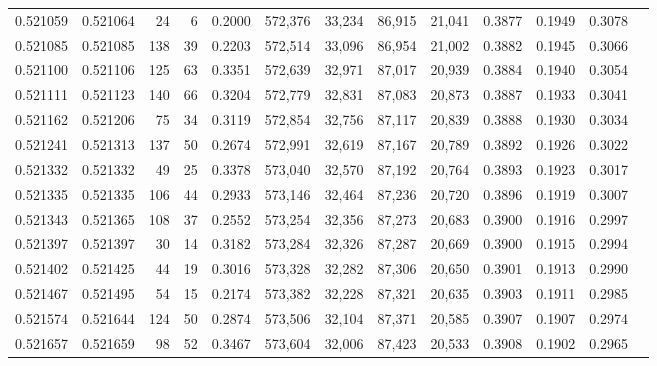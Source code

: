 \begin{tabular}{rrrrrrrrrrrrr}
0.521059 & 0.521064 &    24 &     6 &                                     0.2000 & 572,376 &  33,234 &  86,915 &  21,041 & 0.3877 & 0.1949 & 0.3078 \\
0.521085 & 0.521085 &   138 &    39 &                                     0.2203 & 572,514 &  33,096 &  86,954 &  21,002 & 0.3882 & 0.1945 & 0.3066 \\
0.521100 & 0.521106 &   125 &    63 &                                     0.3351 & 572,639 &  32,971 &  87,017 &  20,939 & 0.3884 & 0.1940 & 0.3054 \\
0.521111 & 0.521123 &   140 &    66 &                                     0.3204 & 572,779 &  32,831 &  87,083 &  20,873 & 0.3887 & 0.1933 & 0.3041 \\
0.521162 & 0.521206 &    75 &    34 &                                     0.3119 & 572,854 &  32,756 &  87,117 &  20,839 & 0.3888 & 0.1930 & 0.3034 \\
0.521241 & 0.521313 &   137 &    50 &                                     0.2674 & 572,991 &  32,619 &  87,167 &  20,789 & 0.3892 & 0.1926 & 0.3022 \\
0.521332 & 0.521332 &    49 &    25 &                                     0.3378 & 573,040 &  32,570 &  87,192 &  20,764 & 0.3893 & 0.1923 & 0.3017 \\
0.521335 & 0.521335 &   106 &    44 &                                     0.2933 & 573,146 &  32,464 &  87,236 &  20,720 & 0.3896 & 0.1919 & 0.3007 \\
0.521343 & 0.521365 &   108 &    37 &                                     0.2552 & 573,254 &  32,356 &  87,273 &  20,683 & 0.3900 & 0.1916 & 0.2997 \\
0.521397 & 0.521397 &    30 &    14 &                                     0.3182 & 573,284 &  32,326 &  87,287 &  20,669 & 0.3900 & 0.1915 & 0.2994 \\
0.521402 & 0.521425 &    44 &    19 &                                     0.3016 & 573,328 &  32,282 &  87,306 &  20,650 & 0.3901 & 0.1913 & 0.2990 \\
0.521467 & 0.521495 &    54 &    15 &                                     0.2174 & 573,382 &  32,228 &  87,321 &  20,635 & 0.3903 & 0.1911 & 0.2985 \\
0.521574 & 0.521644 &   124 &    50 &                                     0.2874 & 573,506 &  32,104 &  87,371 &  20,585 & 0.3907 & 0.1907 & 0.2974 \\
0.521657 & 0.521659 &    98 &    52 &                                     0.3467 & 573,604 &  32,006 &  87,423 &  20,533 & 0.3908 & 0.1902 & 0.2965 \\

\end{tabular}
